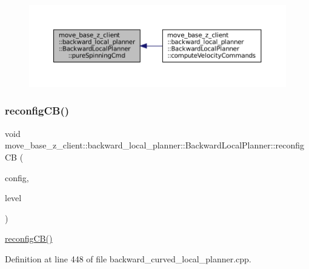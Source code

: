 \begin{figure}[H]
\begin{center}
\leavevmode
\includegraphics[width=350pt]{classmove__base__z__client_1_1backward__local__planner_1_1BackwardLocalPlanner_a3b08865dc8e19750273d971336ecba3b_icgraph}
\end{center}
\end{figure}
\mbox{\label{classmove__base__z__client_1_1backward__local__planner_1_1BackwardLocalPlanner_a9dfe3fd3fd7a0c8ec414a78e1300d09c}} 
\subsubsection{\texorpdfstring{reconfig\+C\+B()}{reconfigCB()}}
{\footnotesize\ttfamily void move\+\_\+base\+\_\+z\+\_\+client\+::backward\+\_\+local\+\_\+planner\+::\+Backward\+Local\+Planner\+::reconfig\+CB (\begin{DoxyParamCaption}\item[{\+::backward\+\_\+local\+\_\+planner\+::\+Backward\+Local\+Planner\+Config \&}]{config,  }\item[{uint32\+\_\+t}]{level }\end{DoxyParamCaption})\hspace{0.3cm}{\ttfamily [private]}}

\hyperlink{classmove__base__z__client_1_1backward__local__planner_1_1BackwardLocalPlanner_a9dfe3fd3fd7a0c8ec414a78e1300d09c}{reconfig\+C\+B()} 

Definition at line 448 of file backward\+\_\+curved\+\_\+local\+\_\+planner.\+cpp.



